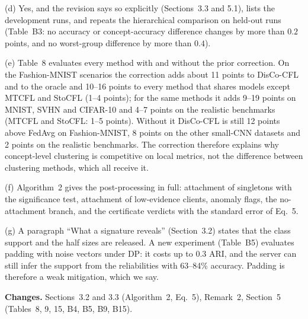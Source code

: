 \documentclass[11pt]{article}
\newcommand{\chg}{\par\noindent\textbf{Changes.} }
\begin{document}
(d) Yes, and the revision says so explicitly (Sections~3.3 and 5.1), lists the development runs, and repeats the hierarchical comparison on held-out runs (Table~B3: no accuracy or concept-accuracy difference changes by more than $0.2$ points, and no worst-group difference by more than $0.4$).

(e) Table~8 evaluates every method with and without the prior correction. On the Fashion-MNIST scenarios the correction adds about 11 points to DisCo-CFL and to the oracle and 10--16 points to every method that shares models except MTCFL and StoCFL (1--4 points); for the same methods it adds 9--19 points on MNIST, SVHN and CIFAR-10 and 4--7 points on the realistic benchmarks (MTCFL and StoCFL: 1--5 points). Without it DisCo-CFL is still 12 points above FedAvg on Fashion-MNIST, 8 points on the other small-CNN datasets and 2 points on the realistic benchmarks. The correction therefore explains why concept-level clustering is competitive on local metrics, not the difference between clustering methods, which all receive it.

(f) Algorithm~2 gives the post-processing in full: attachment of singletons with the significance test, attachment of low-evidence clients, anomaly flags, the no-attachment branch, and the certificate verdicts with the standard error of Eq.~5.

(g) A paragraph ``What a signature reveals'' (Section~3.2) states that the class support and the half sizes are released. A new experiment (Table~B5) evaluates padding with noise vectors under DP: it costs up to $0.3$ ARI, and the server can still infer the support from the reliabilities with 63--84\% accuracy. Padding is therefore a weak mitigation, which we say.
\chg Sections~3.2 and 3.3 (Algorithm~2, Eq.~5), Remark~2, Section~5 (Tables~8, 9, 15, B4, B5, B9, B15).
\end{document}
